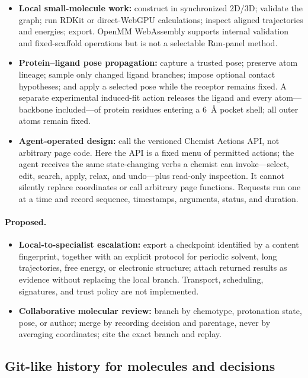 \begin{itemize}
  \item \textbf{Local small-molecule work:} construct in synchronized 2D/3D;
    validate the graph; run RDKit or direct-WebGPU calculations; inspect aligned
    trajectories and energies; export. OpenMM WebAssembly supports internal
    validation and fixed-scaffold operations but is not a selectable Run-panel
    method.
  \item \textbf{Protein--ligand pose propagation:} capture a trusted pose;
    preserve atom lineage; sample only changed ligand branches; impose optional
    contact hypotheses; and apply a selected pose while the receptor remains
    fixed. A separate experimental induced-fit action releases the ligand and
    every atom---backbone included---of protein residues entering a 6~\AA{}
    pocket shell; all outer atoms remain fixed.
  \item \textbf{Agent-operated design:} call the versioned Chemist Actions API,
    not arbitrary page code. Here the API is a fixed menu of permitted actions;
    the agent receives the same state-changing verbs a chemist can invoke---select,
    edit, search, apply, relax, and undo---plus read-only inspection. It cannot
    silently replace coordinates or call arbitrary page functions. Requests run
    one at a time and record sequence, timestamps, arguments, status, and duration.
\end{itemize}

\paragraph{Proposed.}

\begin{itemize}
  \item \textbf{Local-to-specialist escalation:} export a checkpoint identified
    by a content fingerprint, together with an explicit protocol for periodic
    solvent, long trajectories,
    free energy, or electronic structure; attach returned results as evidence
    without replacing the local branch. Transport, scheduling, signatures, and
    trust policy are not implemented.
  \item \textbf{Collaborative molecular review:} branch by chemotype,
    protonation state, pose, or author; merge by recording decision and
    parentage, never by averaging coordinates; cite the exact branch and replay.
\end{itemize}

\subsection{Git-like history for molecules and decisions}
\label{app:molecular-git}

